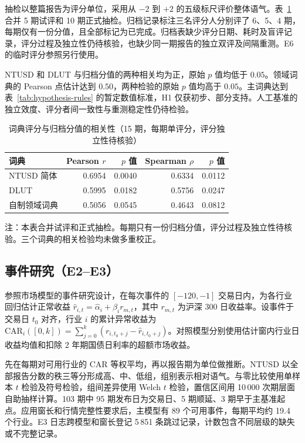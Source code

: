 
抽检以整篇报告为评分单位，采用从 $-2$ 到 $+2$ 的五级标尺评价整体语气。表~\ref{tab:human-agreement} 合并 5 期试评和 10 期正式抽检。归档记录标注三名评分人分别评了 6、5、4 期，每期仅有一份分值，且全部标记为已完成。归档表缺少评分日期、耗时及盲评记录，评分过程及独立性仍待核验，也缺少同一期报告的独立双评及间隔重测。E6 的临时评分参照另行使用。

NTUSD 和 DLUT 与归档分值的两种相关均为正，原始 $p$ 值均低于 $0.05$。领域词典的 Pearson 点估计达到 $0.50$，两种检验的原始 $p$ 值均高于 $0.05$。主词典达到表~\ref{tab:hypothesis-rules} 的暂定数值标准，H1 仅获初步、部分支持。人工基准的独立效度、评分者间一致性与重测稳定性仍待检验。

\begin{table}[htbp]
  \centering\small
  \caption[词典评分与归档分值的相关性]{词典评分与归档分值的相关性（15 期，每期单评分，评分独立性待核验）}
  \label{tab:human-agreement}
  \begin{tabular}{@{}lrrrr@{}}
    \toprule
    词典 & Pearson $r$ & $p$ 值 & Spearman $\rho$ & $p$ 值 \\
    \midrule
    NTUSD 简体 & 0.6954 & 0.0040 & 0.6334 & 0.0112 \\
    DLUT & 0.5995 & 0.0182 & 0.5756 & 0.0247 \\
    自制领域词典 & 0.5056 & 0.0545 & 0.4643 & 0.0812 \\
    \bottomrule
  \end{tabular}
  \par\smallskip
  \parbox{.92\linewidth}{\footnotesize 注：本表合并试评和正式抽检。每期只有一份归档分值，评分过程及独立性待核验。三个词典的相关检验均未做多重校正。}
\end{table}

\subsection{事件研究（E2--E3）}

参照市场模型的事件研究设计\cite{macKinlay1997}，在每次事件的 $[-120,-1]$ 交易日内，为各行业回归估计正常收益 $\widehat r_{i,t}=\widehat\alpha_i+\widehat\beta_i r_{m,t}$，其中 $r_{m,t}$ 为沪深 300 日收益率。设事件于交易日 $t_0$ 对齐，行业 $i$ 的累计异常收益为 $\mathrm{CAR}_{i}([0,k])=\sum_{j=0}^{k}(r_{i,t_0+j}-\widehat r_{i,t_0+j})$。对照模型分别使用估计窗内行业日收益均值和扣除 2 年期国债日利率的超额市场收益。

先在每期对可用行业的 CAR 等权平均，再以报告期为单位做推断。NTUSD 以全部报告分数的秩三等分形成高、中、低组，组别表示相对语气。与零比较使用单样本 $t$ 检验及符号检验，组间差异使用 Welch $t$ 检验，置信区间用 10\,000 次期层面自助抽样计算。103 期中 95 期发布日为交易日、5 期顺延、3 期早于主基准起点。应用窗长和行情完整性要求后，主模型有 89 个可用事件，每期平均约 19.4 个行业。E3 日志跨模型和窗长登记 5\,851 条跳过记录，计数包含不同层级的缺失或不完整记录。


